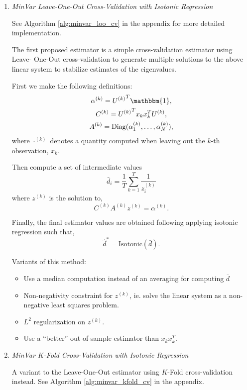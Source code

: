 \documentclass{article}
\begin{document}
\begin{enumerate}

\item \emph{MinVar Leave-One-Out Cross-Validation with Isotonic Regression}

See Algorithm \ref{alg:minvar_loo_cv} in the appendix for more detailed implementation.

The first proposed estimator is a simple cross-validation estimator using Leave-
One-Out cross-validation to generate multiple solutions to the above linear
system to stabilize estimates of the eigenvalues.

First we make the following definitions:
\begin{gather*} 
	\alpha^{(k)} = {U^{(k)}}^T\mathbbm{1}, \\ 
	C^{(k)} = {U^{(k)}}^T x_k x_k^T U^{(k)}, \\
	A^{(k)} = \mathrm{Diag}(\alpha^{(k)}_1, \ldots, \alpha^{(k)}_N),
\end{gather*}
where $\cdot^{(k)}$ denotes a quantity computed when leaving out the $k$-th
observation, $x_k$.

Then compute a set of intermediate values 
$$
	\bar{d}_i = \frac1T \sum_{k=1}^T \frac{1}{z_i^{(k)}}
$$
where $z^{(k)}$ is the solution to,
$$
	C^{(k)} A^{(k)} z^{(k)} = \alpha^{(k)}.
$$

Finally, the final estimator values are obtained following applying isotonic
regression such that,
$$
	\hat{d}^* = \mathrm{Isotonic}(\bar{d}).
$$


Variants of this method:
\begin{itemize}
	\item Use a median computation instead of an averaging for computing $\bar{d}$
	
	\item Non-negativity constraint for $z^{(k)}$, ie. solve the linear system
	as a non-negative least squares problem.
	
	\item $L^2$ regularization on $z^{(k)}$.
	
	\item Use a ``better'' out-of-sample estimator than $x_k x_k^T$.
\end{itemize}


\item \emph{MinVar $K$-Fold Cross-Validation with Isotonic Regression}

A variant to the Leave-One-Out estimator using $K$-Fold cross-validation
instead.  See Algorithm \ref{alg:minvar_kfold_cv} in the appendix.


\end{enumerate}
\end{document}
